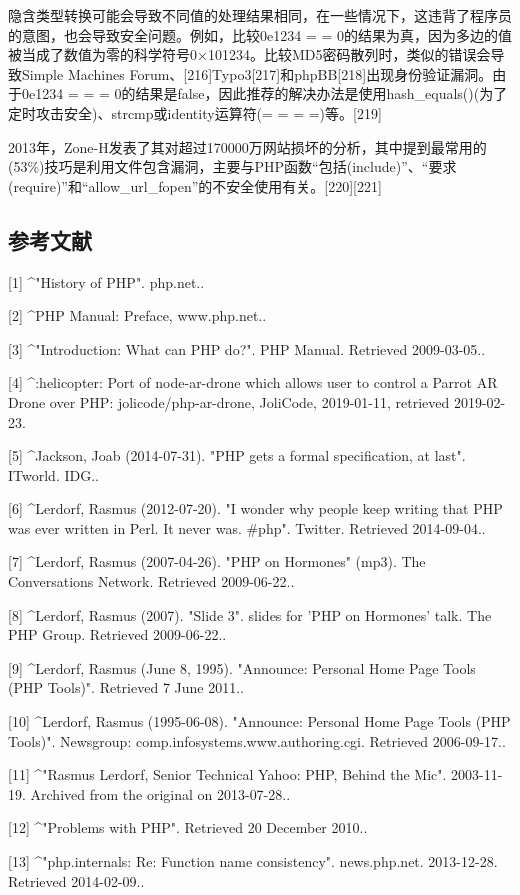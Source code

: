 隐含类型转换可能会导致不同值的处理结果相同，在一些情况下，这违背了程序员的意图，也会导致安全问题。例如，比较0e1234 = = 0的结果为真，因为多边的值被当成了数值为零的科学符号0×101234。比较MD5密码散列时，类似的错误会导致Simple Machines Forum、[216]Typo3[217]和phpBB[218]出现身份验证漏洞。由于0e1234 = = = 0的结果是false，因此推荐的解决办法是使用hash_equals()(为了定时攻击安全)、strcmp或identity运算符(= = = =)等。[219]

2013年，Zone-H发表了其对超过170000万网站损坏的分析，其中提到最常用的(53\%)技巧是利用文件包含漏洞，主要与PHP函数“包括(include)”、“要求(require)”和“allow_url_fopen”的不安全使用有关。[220][221]

\subsection{参考文献}
[1]
^"History of PHP". php.net..

[2]
^PHP Manual: Preface, www.php.net..

[3]
^"Introduction: What can PHP do?". PHP Manual. Retrieved 2009-03-05..

[4]
^:helicopter: Port of node-ar-drone which allows user to control a Parrot AR Drone over PHP: jolicode/php-ar-drone, JoliCode, 2019-01-11, retrieved 2019-02-23.

[5]
^Jackson, Joab (2014-07-31). "PHP gets a formal specification, at last". ITworld. IDG..

[6]
^Lerdorf, Rasmus (2012-07-20). "I wonder why people keep writing that PHP was ever written in Perl. It never was. #php". Twitter. Retrieved 2014-09-04..

[7]
^Lerdorf, Rasmus (2007-04-26). "PHP on Hormones" (mp3). The Conversations Network. Retrieved 2009-06-22..

[8]
^Lerdorf, Rasmus (2007). "Slide 3". slides for 'PHP on Hormones' talk. The PHP Group. Retrieved 2009-06-22..

[9]
^Lerdorf, Rasmus (June 8, 1995). "Announce: Personal Home Page Tools (PHP Tools)". Retrieved 7 June 2011..

[10]
^Lerdorf, Rasmus (1995-06-08). "Announce: Personal Home Page Tools (PHP Tools)". Newsgroup: comp.infosystems.www.authoring.cgi. Retrieved 2006-09-17..

[11]
^"Rasmus Lerdorf, Senior Technical Yahoo: PHP, Behind the Mic". 2003-11-19. Archived from the original on 2013-07-28..

[12]
^"Problems with PHP". Retrieved 20 December 2010..

[13]
^"php.internals: Re: Function name consistency". news.php.net. 2013-12-28. Retrieved 2014-02-09..

